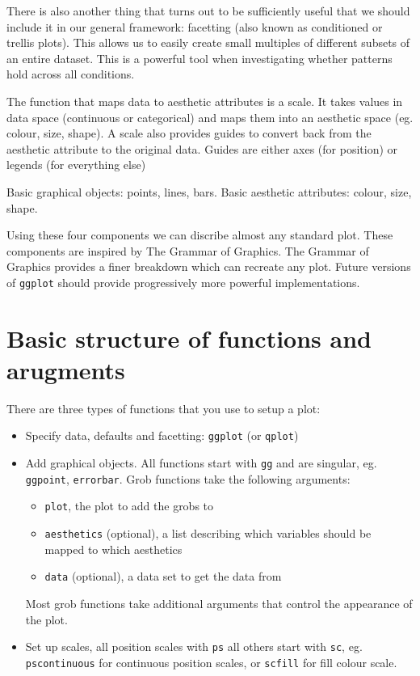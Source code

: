 There is also another thing that turns out to be sufficiently useful that we should include it in our general framework: facetting (also known as conditioned or trellis plots).  This allows us to easily create small multiples of different subsets of an entire dataset.  This is a powerful tool when investigating whether patterns hold across all conditions.

The function that maps data to aesthetic attributes is a scale. It takes values in data space (continuous or categorical) and maps them into an aesthetic space (eg. colour, size, shape).  A scale also provides guides to convert back from the aesthetic attribute to the original data.  Guides are either axes (for position) or legends (for everything else)

Basic graphical objects: points, lines, bars.
Basic aesthetic attributes: colour, size, shape.

Using these four components we can discribe almost any standard plot.  These components are inspired by The Grammar of Graphics.  The Grammar of Graphics provides a finer breakdown which can recreate any plot.  Future versions of {\tt ggplot} should provide progressively more powerful implementations.

\section{Basic structure of functions and arugments}\label{sec:basic_structure_of_functions_and_arugments}

There are three types of functions that you use to setup a plot:

\begin{itemize}
	\item Specify data, defaults and facetting: {\tt ggplot} (or {\tt qplot})
	\item Add graphical objects.  All functions start with {\tt gg} and are singular, eg. {\tt ggpoint}, {\tt errorbar}.  Grob functions take the following arguments:
	
		\begin{itemize}
			\item {\tt plot}, the plot to add the grobs to 
			\item {\tt aesthetics} (optional), a list describing which variables should be mapped to which aesthetics
			\item {\tt data} (optional), a data set to get the data from
		\end{itemize}
		
		Most grob functions take additional arguments that control the appearance of the plot.  
		
	\item Set up scales, all position scales with {\tt ps} all others start with {\tt sc}, eg. {\tt pscontinuous} for continuous position scales, or {\tt scfill} for fill colour scale.
\end{itemize}


